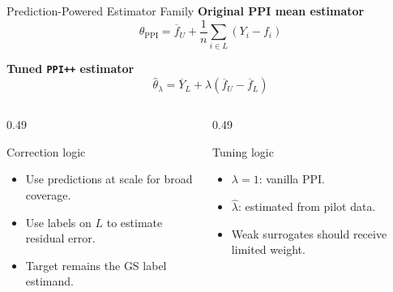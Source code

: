 \documentclass[aspectratio=169,10pt]{beamer}
\newcommand{\PPI}{\mathrm{PPI}}
\newcommand{\PPIPP}{\texttt{PPI++}}
\begin{document}
\begin{frame}{Prediction-Powered Estimator Family}
\textbf{Original PPI mean estimator}
\[
\widehat{\theta}_{\PPI}
=
\overline{f}_{U}
+
\frac{1}{n}\sum_{i\in L}(Y_i-f_i)
\]

\textbf{Tuned \PPIPP{} estimator}
\[
\widehat{\theta}_{\lambda}
=
\overline{Y}_{L}
+
\lambda(\overline{f}_{U}-\overline{f}_{L})
\]

\begin{columns}[T,totalwidth=\textwidth]
\begin{column}{0.49\textwidth}
\begin{block}{Correction logic}
\begin{itemize}
  \item Use predictions at scale for broad coverage.
  \item Use labels on \(L\) to estimate residual error.
  \item Target remains the GS label estimand.
\end{itemize}
\end{block}
\end{column}
\begin{column}{0.49\textwidth}
\begin{block}{Tuning logic}
\begin{itemize}
  \item \(\lambda=1\): vanilla PPI.
  \item \(\hat\lambda\): estimated from pilot data.
  \item Weak surrogates should receive limited weight.
\end{itemize}
\end{block}
\end{column}
\end{columns}
\end{frame}
\end{document}
